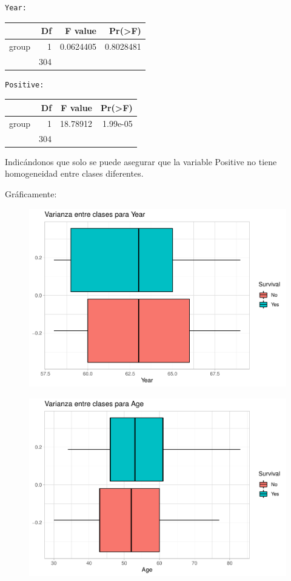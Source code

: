 \begin{verbatim}
Year:
\end{verbatim}

\begin{tabular}{l|r|r|r}
\hline
  & Df & F value & Pr(>F)\\
\hline
group & 1 & 0.0624405 & 0.8028481\\
\hline
 & 304 &  & \\
\hline
\end{tabular}

\begin{verbatim}
Positive:
\end{verbatim}

\begin{tabular}{l|r|r|r}
\hline
  & Df & F value & Pr(>F)\\
\hline
group & 1 & 18.78912 & 1.99e-05\\
\hline
 & 304 &  & \\
\hline
\end{tabular}

Indicándonos que solo se puede asegurar que la variable Positive no tiene homogeneidad entre clases diferentes.

\vspace{\baselineskip}

Gráficamente:

\begin{figure}[H]\center\includegraphics[width=.8\linewidth]{img/Clasificacion_files/figure-latex/unnamed-chunk-19-1}\caption{}\end{figure}

\begin{figure}[H]\center\includegraphics[width=.8\linewidth]{img/Clasificacion_files/figure-latex/unnamed-chunk-19-2}\caption{}\end{figure}

